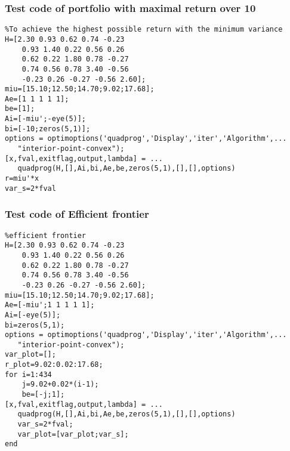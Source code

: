 \subsubsection{\bfseries Test code of portfolio with maximal return over 10}
\label{6.3.2}
{\setmainfont{Courier New Bold} \scriptsize         
\begin{lstlisting}
%To achieve the highest possible return with the minimum variance
H=[2.30 0.93 0.62 0.74 -0.23
    0.93 1.40 0.22 0.56 0.26
    0.62 0.22 1.80 0.78 -0.27
    0.74 0.56 0.78 3.40 -0.56
    -0.23 0.26 -0.27 -0.56 2.60];
miu=[15.10;12.50;14.70;9.02;17.68];
Ae=[1 1 1 1 1];
be=[1];
Ai=[-miu';-eye(5)];
bi=[-10;zeros(5,1)];
options = optimoptions('quadprog','Display','iter','Algorithm',...
   "interior-point-convex");
[x,fval,exitflag,output,lambda] = ...
   quadprog(H,[],Ai,bi,Ae,be,zeros(5,1),[],[],options)
r=miu'*x
var_s=2*fval
\end{lstlisting}}
\subsubsection{\bfseries Test code of Efficient frontier}
\label{6.3.3}
{\setmainfont{Courier New Bold} \scriptsize         
\begin{lstlisting}
%efficient frontier
H=[2.30 0.93 0.62 0.74 -0.23
    0.93 1.40 0.22 0.56 0.26
    0.62 0.22 1.80 0.78 -0.27
    0.74 0.56 0.78 3.40 -0.56
    -0.23 0.26 -0.27 -0.56 2.60];
miu=[15.10;12.50;14.70;9.02;17.68];
Ae=[-miu';1 1 1 1 1];
Ai=[-eye(5)];
bi=zeros(5,1);
options = optimoptions('quadprog','Display','iter','Algorithm',...
   "interior-point-convex");
var_plot=[];
r_plot=9.02:0.02:17.68;
for i=1:434
    j=9.02+0.02*(i-1);
    be=[-j;1];
[x,fval,exitflag,output,lambda] = ...
   quadprog(H,[],Ai,bi,Ae,be,zeros(5,1),[],[],options)
   var_s=2*fval;
   var_plot=[var_plot;var_s];
end
\end{lstlisting}}
